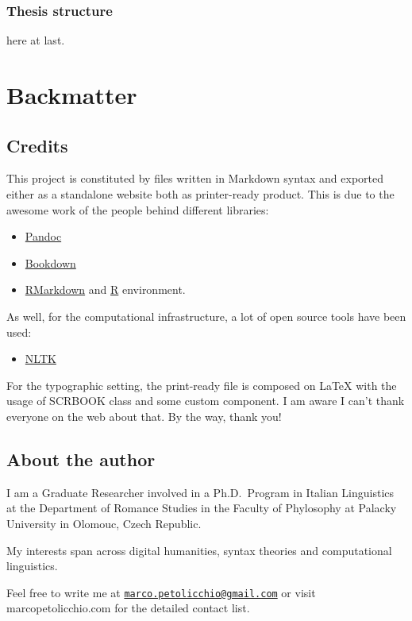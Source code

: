 \documentclass[a4paper,twoside,11pt,chapterprefix=false,bibliography=totocnumbered]{scrbook}
\providecommand{\tightlist}{%
  \setlength{\itemsep}{0pt}\setlength{\parskip}{0pt}}
\theoremstyle{definition}
\theoremstyle{definition}
\theoremstyle{definition}
\theoremstyle{remark}
\begin{document}
\subsection{Thesis structure}\label{thesis-structure}

here at last.

\chapter*{Backmatter}\label{backmatter}

\section*{Credits}\label{credits}

This project is constituted by files written in Markdown syntax and
exported either as a standalone website both as printer-ready product.
This is due to the awesome work of the people behind different
libraries:

\begin{itemize}
\tightlist
\item
  \href{https://bookdown.org}{Pandoc}
\item
  \href{https://bookdown.org}{Bookdown}
\item
  \href{https://bookdown.org}{RMarkdown} and
  \href{https://bookdown.org}{R} environment.
\end{itemize}

As well, for the computational infrastructure, a lot of open source
tools have been used:

\begin{itemize}
\tightlist
\item
  \href{https://bookdown.org}{NLTK}
\end{itemize}

For the typographic setting, the print-ready file is composed on LaTeX
with the usage of SCRBOOK class and some custom component. I am aware I
can't thank everyone on the web about that. By the way, thank you!

\section*{About the author}\label{about-the-author}

I am a Graduate Researcher involved in a Ph.D.~Program in Italian
Linguistics at the Department of Romance Studies in the Faculty of
Phylosophy at Palacky University in Olomouc, Czech Republic.

My interests span across digital humanities, syntax theories and
computational linguistics.

Feel free to write me at
\href{mailto:marco.petolicchio@gmail.com}{\nolinkurl{marco.petolicchio@gmail.com}}
or visit marcopetolicchio.com for the detailed contact list.


\end{document}
